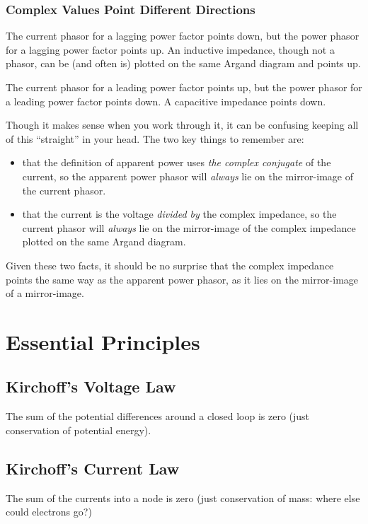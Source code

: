 \documentclass[11pt]{article}
\begin{document}
\subsubsection{Complex Values Point Different Directions}

The current phasor for a lagging power factor points down, but the
power phasor for a lagging power factor points up. An inductive
impedance, though not a phasor, can be (and often is) plotted on the
same Argand diagram and points up.

The current phasor for a leading power factor points up, but the power
phasor for a leading power factor points down. A capacitive impedance
points down.

Though it makes sense when you work through it, it can be confusing
keeping all of this ``straight'' in your head. The two key things to
remember are: 
\begin{itemize}
  \item that the definition of apparent power uses \emph{the complex
  conjugate} of the current, so the apparent power phasor will
    \emph{always} lie on the mirror-image of the current phasor.
  \item that the current is the voltage \emph{divided by} the complex
    impedance, so the current phasor will \emph{always} lie on the
    mirror-image of the complex impedance plotted on the same Argand
    diagram.
\end{itemize}

Given these two facts, it should be no surprise that the complex
impedance points the same way as the apparent power phasor, as it lies
on the mirror-image of a mirror-image.

\section{Essential Principles}

\subsection{Kirchoff's Voltage Law}

The sum of the potential differences around a closed loop is zero
(just conservation of potential energy).

\subsection{Kirchoff's Current Law}

The sum of the currents into a node is zero (just conservation of
mass: where else could electrons go?)
\end{document}
